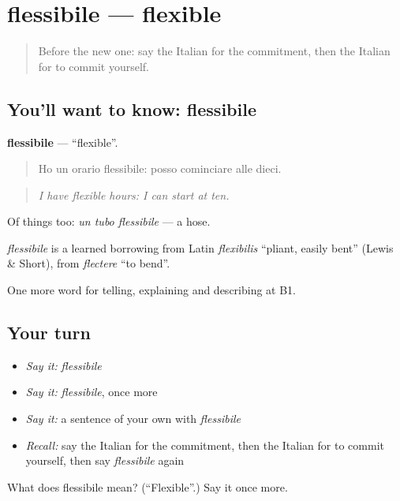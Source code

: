 \section[flessibile]{flessibile — flexible}

\label{lesson:IT-C377-flessibile}



\begin{quote}
Before the new one: say the Italian for the commitment, then the Italian for to commit yourself.
\end{quote}

\subsection*{You'll want to know: flessibile}
\textbf{flessibile} — \textquotedblleft{}flexible\textquotedblright{}.

\begin{quote}
Ho un orario flessibile: posso cominciare alle dieci.
\end{quote}

\begin{quote}
\emph{I have flexible hours: I can start at ten.}
\end{quote}

Of things too: \emph{un tubo flessibile} — a hose.

\begin{cousinweb}
\emph{flessibile} is a learned borrowing from Latin \emph{flexibilis} \textquotedblleft{}pliant, easily bent\textquotedblright{} (Lewis \& Short), from \emph{flectere} \textquotedblleft{}to bend\textquotedblright{}.
\end{cousinweb}

\begin{grammarlens}[title={What you've built}]
One more word for telling, explaining and describing at B1.
\end{grammarlens}

\subsection*{Your turn}
\begin{itemize}
\raggedright
  \item \emph{Say it:} \emph{flessibile}
  \item \emph{Say it:} \emph{flessibile}, once more
  \item \emph{Say it:} a sentence of your own with \emph{flessibile}
  \item \emph{Recall:} say the Italian for the commitment, then the Italian for to commit yourself, then say \emph{flessibile} again
\end{itemize}

\begin{tcolorbox}[breakable,colback=teal!4,colframe=teal!35!black,title={Before you move on}]
What does flessibile mean? (\textquotedblleft{}Flexible\textquotedblright{}.) Say it once more.
\end{tcolorbox}
